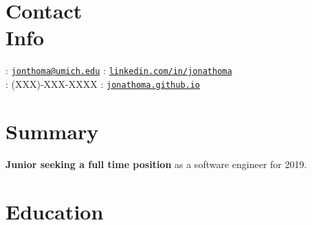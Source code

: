\documentclass[margin,line]{resume}
\begin{document}
\begin{resume}
	\vspace{-3.5mm}
	\section{\mysidestyle Contact\\Info}
	\noindent \faEnvelope : \href{mailto:jonthoma@umich.edu}{\nolinkurl{jonthoma@umich.edu}} \hfill \faLinkedinSign : \href{https://linkedin.com/in/jonathoma}{\nolinkurl{linkedin.com/in/jonathoma}}\\
	\noindent \faPhone : (XXX)-XXX-XXXX \hfill \faUser : \href{https://jonathoma.github.io}{\nolinkurl{jonathoma.github.io}} \\ %
	\vspace{-2.5mm}
	    
	\sectionbreak
	\vspace{-3.5mm}
	\section{\mysidestyle Summary}
	\textbf{Junior seeking a full time position} as a software engineer for 2019. \vspace{-2.5mm}\\ 
	    
	\sectionbreak
	\vspace{-2.5mm}
	\section{\mysidestyle Education}
	

\end{resume}
\end{document}
